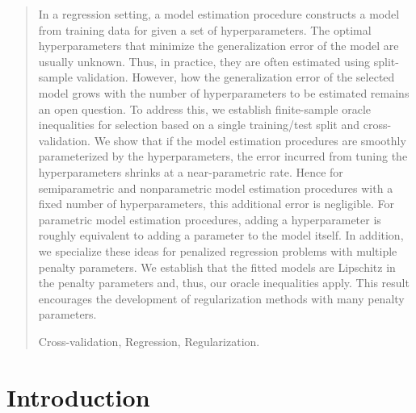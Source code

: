 \documentclass[12pt]{article} %
\renewcommand{\theequation}{\thesection\arabic{equation}}
\theoremstyle{definition}
\begin{document}
\begin{quotation}
In a regression setting, a model estimation procedure constructs a model from training data for given a set of hyperparameters.
The optimal hyperparameters that minimize the generalization error of the model are usually unknown.
Thus, in practice, they are often estimated using split-sample validation.
However, how the generalization error of the selected model grows with the number of hyperparameters to be estimated remains an open question.
To address this, we establish finite-sample oracle inequalities for selection based on a single training/test split and cross-validation.
We show that if the model estimation procedures are smoothly parameterized by the hyperparameters, the error incurred from tuning the hyperparameters shrinks at a near-parametric rate.
Hence for semiparametric and nonparametric model estimation procedures with a fixed number of hyperparameters, this additional error is negligible.
For parametric model estimation procedures, adding a hyperparameter is roughly equivalent to adding a parameter to the model itself.
In addition, we specialize these ideas for penalized regression problems with multiple penalty parameters.
We establish that the fitted models are Lipschitz in the penalty parameters and, thus, our oracle inequalities apply.
This result encourages the development of regularization methods with many penalty parameters.
\vspace{9pt}

Cross-validation, Regression, Regularization.
\par
\end{quotation}\par

\def\thefigure{\arabic{figure}}
\def\thetable{\arabic{table}}

\renewcommand{\theequation}{\thesection.\arabic{equation}}



\fontsize{12}{14pt plus.8pt minus .6pt}\selectfont

\setcounter{section}{1} %
\setcounter{equation}{0} %

\section{Introduction}
\end{document}
